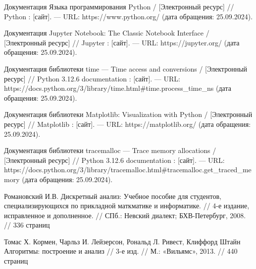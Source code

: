 \begin{thebibliography}{}
   Документация Языка программирования Python /  [Электронный ресурс] // Python : [сайт]. — URL: https://www.python.org/ (дата обращения: 25.09.2024).
  
   Документация Jupyter Notebook: The Classic Notebook Interface /  [Электронный ресурс] // Jupyter : [сайт]. — URL: https://jupyter.org/ (дата обращения: 25.09.2024).
  
   Документация библиотеки time — Time access and conversions /  [Электронный ресурс] // Python 3.12.6 documentation : [сайт]. — URL: https://docs.python.org/3/library/time.html\#time.process\_time\_ns (дата обращения: 25.09.2024).

   Документация библиотеки Matplotlib: Visualization with Python /  [Электронный ресурс] // Matplotlib : [сайт]. — URL: https://matplotlib.org/ (дата обращения: 25.09.2024).

   Документация библиотеки tracemalloc — Trace memory allocations /  [Электронный ресурс] // Python 3.12.6 documentation : [сайт]. — URL: https://docs.python.org/3/library/tracemalloc.html\#tracemalloc.get\_traced\_memory (дата обращения: 25.09.2024).

   Романовский И.В. Дискретный анализ: Учебное пособие для студентов, специализирующихся по прикладной маткматике и информатике. // 4-е издание, исправленное и дополненное. // СПб.: Невский диалект; БХВ-Петербург, 2008. // 336 страниц 

   Томас Х. Кормен, Чарльз И. Лейзерсон, Рональд Л. Ривест, Клиффорд Штайн Алгоритмы: построение и анализ // 3-е изд. // М.: «Вильямс», 2013. // 440 страниц

\end{thebibliography}